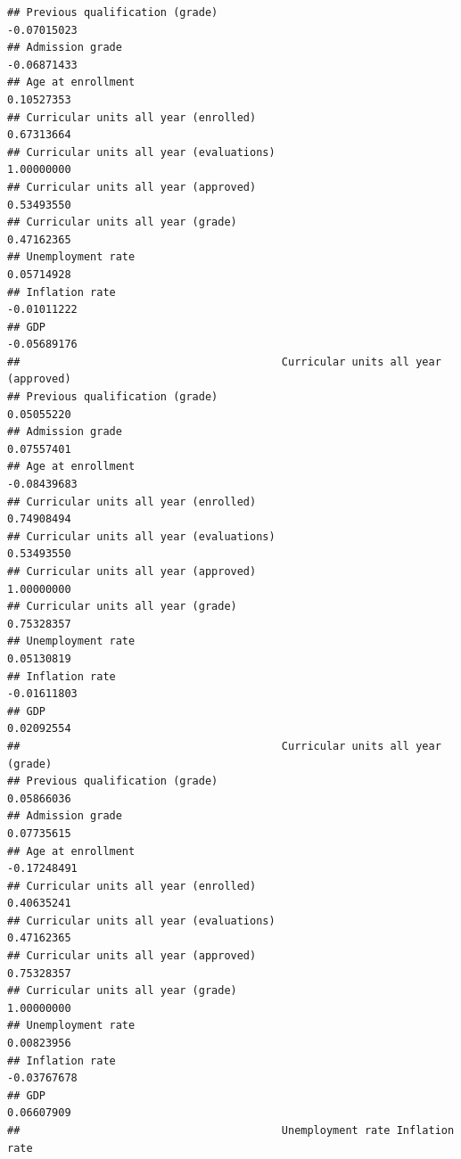 \documentclass[
]{article}
\begin{document}
\begin{verbatim}
## Previous qualification (grade)                                      -0.07015023
## Admission grade                                                     -0.06871433
## Age at enrollment                                                    0.10527353
## Curricular units all year (enrolled)                                 0.67313664
## Curricular units all year (evaluations)                              1.00000000
## Curricular units all year (approved)                                 0.53493550
## Curricular units all year (grade)                                    0.47162365
## Unemployment rate                                                    0.05714928
## Inflation rate                                                      -0.01011222
## GDP                                                                 -0.05689176
##                                         Curricular units all year (approved)
## Previous qualification (grade)                                    0.05055220
## Admission grade                                                   0.07557401
## Age at enrollment                                                -0.08439683
## Curricular units all year (enrolled)                              0.74908494
## Curricular units all year (evaluations)                           0.53493550
## Curricular units all year (approved)                              1.00000000
## Curricular units all year (grade)                                 0.75328357
## Unemployment rate                                                 0.05130819
## Inflation rate                                                   -0.01611803
## GDP                                                               0.02092554
##                                         Curricular units all year (grade)
## Previous qualification (grade)                                 0.05866036
## Admission grade                                                0.07735615
## Age at enrollment                                             -0.17248491
## Curricular units all year (enrolled)                           0.40635241
## Curricular units all year (evaluations)                        0.47162365
## Curricular units all year (approved)                           0.75328357
## Curricular units all year (grade)                              1.00000000
## Unemployment rate                                              0.00823956
## Inflation rate                                                -0.03767678
## GDP                                                            0.06607909
##                                         Unemployment rate Inflation rate

\end{verbatim}
\end{document}

